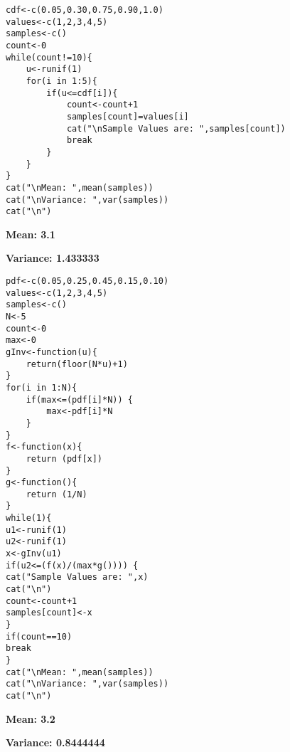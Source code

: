 \documentclass[11pt]{article}
\begin{document}

\begin{lstlisting}
cdf<-c(0.05,0.30,0.75,0.90,1.0)
values<-c(1,2,3,4,5)
samples<-c()
count<-0
while(count!=10){
	u<-runif(1)
	for(i in 1:5){
		if(u<=cdf[i]){
			count<-count+1
			samples[count]=values[i]
			cat("\nSample Values are: ",samples[count])
			break
		}
	}
}
cat("\nMean: ",mean(samples))
cat("\nVariance: ",var(samples))
cat("\n")
\end{lstlisting}



\textbf{Mean: 3.1}\

\textbf{Variance: 1.433333}\




\begin{lstlisting}
pdf<-c(0.05,0.25,0.45,0.15,0.10)
values<-c(1,2,3,4,5)
samples<-c()
N<-5
count<-0
max<-0
gInv<-function(u){
	return(floor(N*u)+1)
}
for(i in 1:N){
	if(max<=(pdf[i]*N)) {
		max<-pdf[i]*N
	}
}
f<-function(x){
	return (pdf[x])
}
g<-function(){
	return (1/N)
}
while(1){
u1<-runif(1)
u2<-runif(1)
x<-gInv(u1)
if(u2<=(f(x)/(max*g()))) {
cat("Sample Values are: ",x)
cat("\n")
count<-count+1
samples[count]<-x
}
if(count==10)
break
}
cat("\nMean: ",mean(samples))
cat("\nVariance: ",var(samples))
cat("\n")
\end{lstlisting}


\textbf{Mean: 3.2}\

\textbf{Variance: 0.8444444}\
\end{document}

